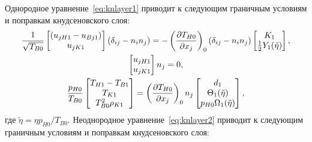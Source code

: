 Однородное уравнение~\eqref{eq:knlayer1} приводит к следующим
граничным условиям и поправкам кнудсеновского слоя:
\begin{gather}
    \frac1{\sqrt{T_{B0}}}\begin{bmatrix} (u_{jH1} - u_{Bj1}) \\ u_{jK1} \end{bmatrix} \deltann{i}{j} =
        - \onwall{\pder[T_{H0}]{x_j}} \deltann{i}{j}
        \begin{bmatrix} K_1 \\ \frac12 Y_1(\tilde\eta) \end{bmatrix}, \label{eq:kgf:boundary_u1t}\\
    \begin{bmatrix} u_{jH1} \\ u_{jK1} \end{bmatrix} n_j = 0, \label{eq:kgf:boundary_u1n}\\
    \frac{p_{H0}}{T_{B0}}\begin{bmatrix} T_{H1} - T_{B1} \\ T_{K1} \\ T_{B0}^2\rho_{K1} \end{bmatrix} =
        \onwall{\pder[T_{H0}]{x_j}} n_j
        \begin{bmatrix} d_1 \\ \Theta_1(\tilde\eta) \\ p_{H0}\Omega_1(\tilde\eta) \end{bmatrix}, \label{eq:kgf:boundary_T1}
\end{gather}
где \(\tilde\eta = \eta p_{H0}/T_{B0}\).
Неоднородное уравнение~\eqref{eq:knlayer2} приводит к следующим
граничным условиям и поправкам кнудсеновского слоя:
